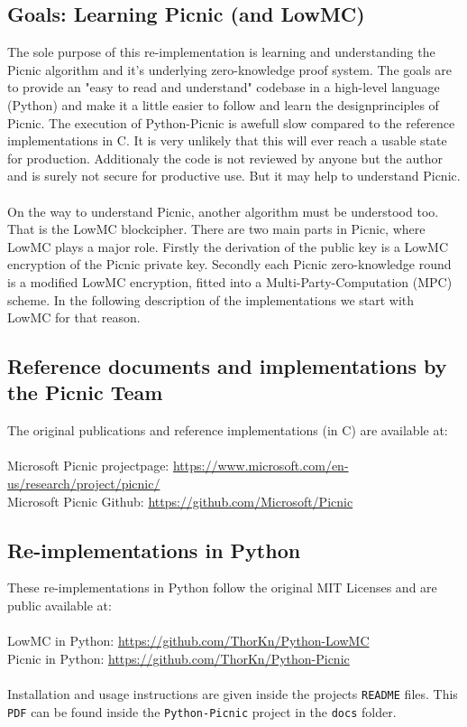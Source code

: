 \documentclass[]{article}
\begin{document}
\subsection{Goals: Learning Picnic (and LowMC)}
The sole purpose of this re-implementation is learning and understanding the Picnic algorithm and it's underlying zero-knowledge proof system. The goals are to provide an "easy to read and understand" codebase in a high-level language (Python) and make it a little easier to follow and learn the designprinciples of Picnic. The execution of Python-Picnic is awefull slow compared to the reference implementations in C. It is very unlikely that this will ever reach a usable state for production. Additionaly the code is not reviewed by anyone but the author and is surely not secure for productive use. But it may help to understand Picnic.\\ \\
On the way to understand Picnic, another algorithm must be understood too. That is the LowMC blockcipher. There are two main parts in Picnic, where LowMC plays a major role. Firstly the derivation of the public key is a LowMC encryption of the Picnic private key. Secondly each Picnic zero-knowledge round is a modified LowMC encryption, fitted into a Multi-Party-Computation (MPC) scheme. In the following description of the implementations we start with LowMC for that reason.
\subsection{Reference documents and implementations by the Picnic Team}
The original publications and reference implementations (in C) are available at: \\ \\
Microsoft Picnic projectpage: \url{https://www.microsoft.com/en-us/research/project/picnic/}\\
Microsoft Picnic Github: \url{https://github.com/Microsoft/Picnic}
\subsection{Re-implementations in Python}
These re-implementations in Python follow the original MIT Licenses and are public available at:\\ \\
LowMC in Python: \url{https://github.com/ThorKn/Python-LowMC}\\
Picnic in Python: \url{https://github.com/ThorKn/Python-Picnic}\\ \\
Installation and usage instructions are given inside the projects \texttt{README} files. This \texttt{PDF} can be found inside the \texttt{Python-Picnic} project in the \texttt{docs} folder.
\end{document}

